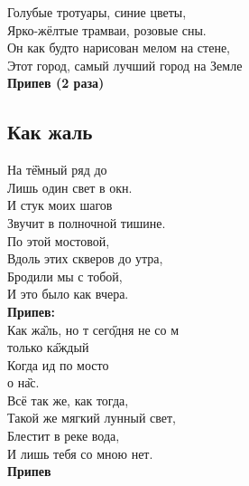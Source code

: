 \documentclass[fleqn,a5paper,12pt,twoside]{guitartabs}
\begin{document}
    Голубые тротуары, синие цветы,\\
    Ярко-жёлтые трамваи, розовые сны.\\
    Он как будто нарисован мелом на стене,\\
    Этот город, самый лучший город на Земле  \\
    
    \-\hspace{10mm}\textbf{ Припев (2 раза)}
\newpage
{}%
\subsection*{Как жаль} 
    На т\G{ёмный} ряд до\C{ } \\
    Лишь один свет в окн.\\
    И стук моих шагов \\
    Звучит в полночной тишине.\\
	По этой мостовой, \\
    Вдоль этих скверов до утра,\\
	Бродили мы с тобой, \\
    И это было как вчера.\\
    
	\-\hspace{10mm}\textbf{Припев:}\\
    \-\hspace{10mm}Как ж\G{аль}, но т сег\H{одня} не со м\\
    \-\hspace{10mm} только к\H{аждый} \\
    \-\hspace{10mm}Когда ид по  мосто\\
    \-\hspace{10mm}  о н\G{ас}.\\
	
    Всё так же, как тогда, \\
    Такой же мягкий лунный свет,\\
    Блестит в реке вода, \\
    И лишь тебя со мною нет.\\
 
	\-\hspace{10mm}\textbf{Припев}

\newpage
{}%
\end{document}
